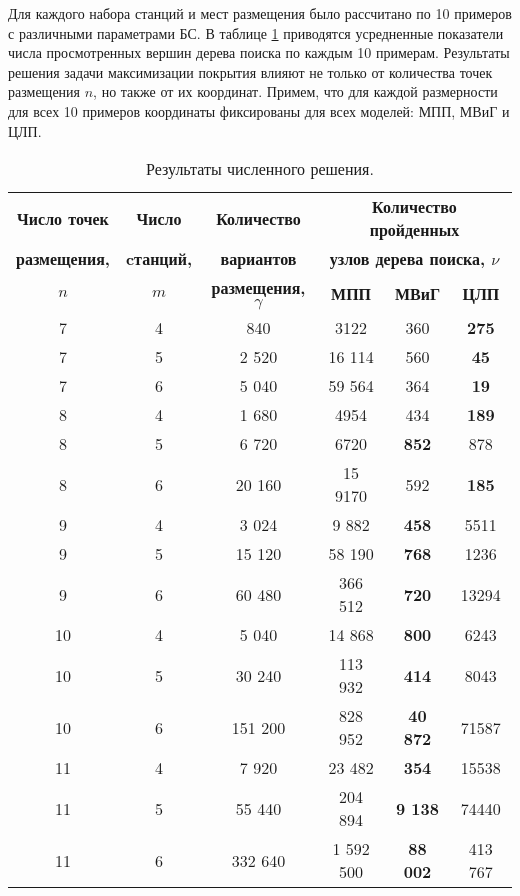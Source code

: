 Для каждого набора станций и мест размещения было рассчитано по 10 примеров с различными параметрами БС. В таблице \cref{tab:models_comparation} приводятся усредненные показатели числа просмотренных вершин дерева поиска по каждым 10 примерам. Результаты решения задачи максимизации покрытия влияют не только от количества точек размещения $n$, но также от их координат. Примем, что для каждой размерности для всех 10 примеров координаты фиксированы для всех моделей: МПП, МВиГ и ЦЛП. 


\begin{table}
  \caption{Результаты численного решения.}\label{tab:models_comparation}
  \begin{tabular}{|ccc|*{3}{c}|} \cline{3-6}
  \hline
  \textbf{Число точек} & \textbf{Число} &\textbf{Количество} & \multicolumn{3}{c|}{\textbf{Количество пройденных}}\\ 
  \textbf{размещения,} & \textbf{cтанций,} & \textbf{вариантов} & \multicolumn{3}{c|}{\textbf{узлов дерева поиска, $\nu$}}\\
  \cline{4-6}
  \textbf{$n$} & \textbf{$m$} &\textbf{размещения, $\gamma$} & \textbf{МПП}& \textbf{МВиГ} & \textbf{ЦЛП} \\ 
  \hline
  7 &  4 & 840 & 3122 & 360 &  \textbf{275} \\
  7 &  5 & 2 520 & 16 114 & 560  &  \textbf{45}  \\
  7 &  6 & 5 040 & 59 564 & 364  &  \textbf{19}  \\
  8 &  4 & 1 680 &  4954 &  434 &   \textbf{189} \\
  8 &  5 & 6 720 & 6720 & \textbf{852}  &  878 \\
  8 &  6 & 20 160 &  15 9170 & 592  & \textbf{185}  \\
  9  &  4 & 3 024 & 9 882 & \textbf{458} & 5511 \\
  9  &  5 & 15 120&  58 190 &  \textbf{768} &  1236\\
  9  &  6 & 60 480&  366 512 &  \textbf{720} & 13294 \\
  10 &  4 & 5 040&  14 868&  \textbf{800}&  6243\\
  10 &	5 & 30 240&  113 932&  \textbf{414}&  8043\\
  10 &	6 & 151 200&  828 952&  \textbf{40 872}&  71587\\
  11 &  4 & 7 920& 23 482&  \textbf{354} & 15538\\
  11 &	5 & 55 440& 204 894& \textbf{9 138}&  74440\\
  11 &	6 & 332 640& 1 592 500 & \textbf{88 002} & 413 767 \\
  \hline
  \end{tabular}
\end{table} 
\normalsize

